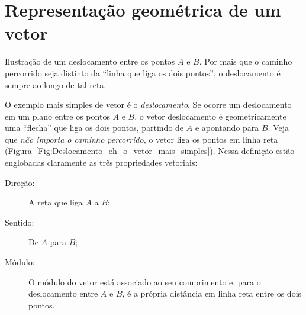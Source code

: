 
\section{Representação geométrica de um vetor}

\begin{marginfigure}
\centering
{}
\caption{Ilustração de um deslocamento entre os pontos $A$ e $B$. Por mais que o caminho percorrido seja distinto da ``linha que liga os dois pontos'', o deslocamento é sempre ao longo de tal reta.}
\end{marginfigure}

O exemplo mais simples de vetor é o \emph{deslocamento}. Se ocorre um deslocamento em um plano entre os pontos $A$ e $B$, o vetor deslocamento é geometricamente uma ``flecha'' que liga os dois pontos, partindo de $A$ e apontando para $B$. Veja que \emph{não importa o caminho percorrido}, o vetor liga os pontos em linha reta (Figura~\ref{Fig:Deslocamento_eh_o_vetor_mais_simples}). Nessa definição estão englobadas claramente as três propriedades vetoriais:
\begin{description}
    \item[Direção:] A reta que liga $A$ a $B$;
    \item[Sentido:] De $A$ para $B$;
    \item[Módulo:] O módulo do vetor está associado ao seu comprimento e, para o deslocamento entre $A$ e $B$, é a própria distância em linha reta entre os dois pontos.
\end{description}

